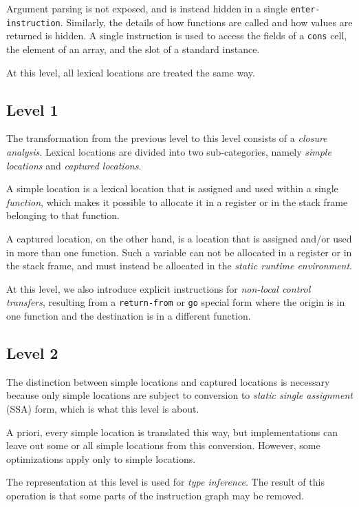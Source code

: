 Argument parsing is not exposed, and is instead hidden in a single
\texttt{enter-instruction}.  Similarly, the details of how functions
are called and how values are returned is hidden.  A single
instruction is used to access the fields of a \texttt{cons} cell, the
element of an array, and the slot of a standard instance. 

At this level, all lexical locations are treated the same way. 

\subsection{Level 1}

The transformation from the previous level to this level consists of a
\emph{closure analysis}.  Lexical locations are divided into two
sub-categories, namely \emph{simple locations} and \emph{captured
  locations}.  

A simple location is a lexical location that is assigned and used
within a single \emph{function}, which makes it possible to allocate
it in a register or in the stack frame belonging to that function.

A captured location, on the other hand, is a location that is assigned
and/or used in more than one function.  Such a variable can not be
allocated in a register or in the stack frame, and must instead be
allocated in the \emph{static runtime environment}. 

At this level, we also introduce explicit instructions for
\emph{non-local control transfers}, resulting from a
\texttt{return-from} or \texttt{go} special form where the origin is
in one function and the destination is in a different function.

\subsection{Level 2}

The distinction between simple locations and captured locations is
necessary because only simple locations are subject to conversion to
\emph{static single assignment} (SSA) form, which is what this level is
about.  

A priori, every simple location is translated this way, but
implementations can leave out some or all simple locations from this
conversion.  However, some optimizations apply only to simple
locations. 

The representation at this level is used for \emph{type inference}.
The result of this operation is that some parts of the instruction
graph may be removed.

